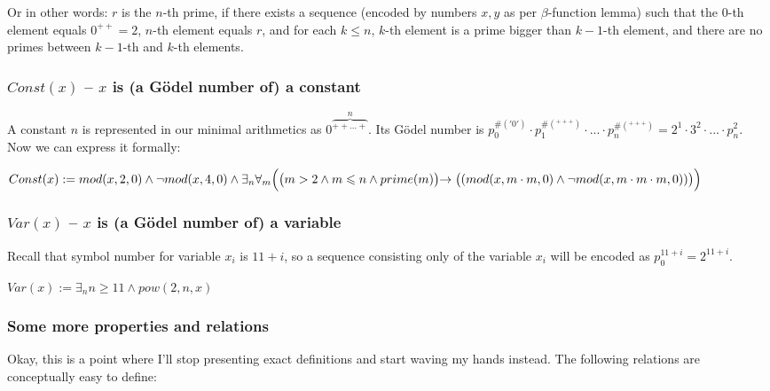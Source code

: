 \documentclass{article}
\begin{document}
Or in other words: $r$ is the $n$-th prime, if there exists a sequence (encoded by numbers
$x, y$ as per $\beta$-function lemma) such that the $0$-th element equals $0^{++} = 2$, $n$-th element
equals $r$, and for each $k \leqslant n$, $k$-th element is a prime bigger than $k-1$-th element,
and there are no primes between $k-1$-th and $k$-th elements.

\subsubsection{$Const(x)$ -- $x$ is (a Gödel number of) a constant}

A constant $n$ is represented in our minimal arithmetics as $0\overbrace{^{++...+}}^{n}$.
Its Gödel number is $p_0^{\#('0')} \cdot p_1^{\#(^{+++})} \cdot ... \cdot p_n^{\#(^{+++})} =
2^1 \cdot 3^2 \cdot ... \cdot p_n^2$. Now we can express it formally:

\begin{center}
    $Const(x) := mod(x, 2, 0) \land \neg mod(x, 4, 0) \land
    \exists_n \forall_m \Bigl(
        \bigl(
            m > 2 \land m \leqslant n \land prime(m)
        \bigl)
        \rightarrow
        \bigl(
            (mod(x, m \cdot m, 0) \land \neg mod(x, m \cdot m \cdot m, 0))
        \bigl)
    \Bigl)$
\end{center}

\subsubsection{$Var(x)$ -- $x$ is (a Gödel number of) a variable}

Recall that symbol number for variable $x_i$ is $11 + i$, so a sequence consisting only of
the variable $x_i$ will be encoded as $p_0^{11 + i} = 2^{11 + i}$.

\begin{center}
    $Var(x) := \exists_n n \geqslant 11 \land pow(2, n, x)$
\end{center}

\subsubsection{Some more properties and relations}

Okay, this is a point where I'll stop presenting exact definitions and start waving my hands
instead. The following relations are conceptually easy to define:
\end{document}
